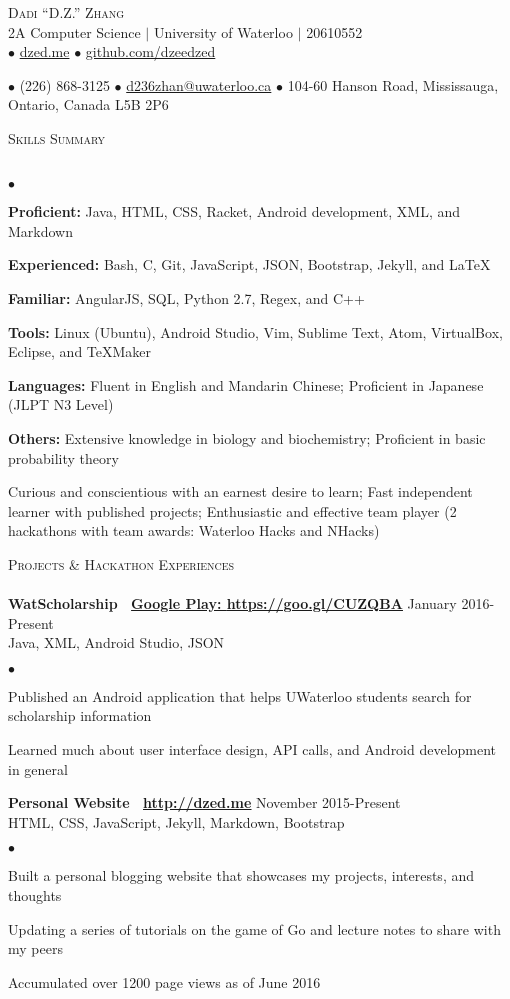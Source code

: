 \documentclass{article}
\newcommand{\lineunder}{\vspace*{-8pt} \\ \hspace*{-18pt} \hrulefill \\}
\newcommand{\header}[1]{{\hspace*{-15pt}\vspace*{6pt} \textsc{#1}} \vspace*{-6pt} \lineunder}
\newcommand{\employer}[3]{{ \textbf{#1} \hfill #2\\ {#3}\\  }}
\newcommand{\contact}[3]{
\begin{center}
{}
\end{center}
\vspace*{-8pt}
\begin{center}
{\LARGE \scshape {#1}}\\
#2\\
#3
\end{center}
\vspace*{-8pt}
}
\newenvironment{achievements}{\begin{list}{$\bullet$}{\topsep 0pt \itemsep -2pt}}{\vspace*{4pt}\end{list}}
\begin{document}
\small
\smallskip
\vspace*{-88pt}

\contact{Dadi ``D.Z.'' Zhang}
{2A Computer Science $\vert$ University of Waterloo $\vert$ 20610552}
{$\bullet$ \href{http://dzed.me}{dzed.me}
$\bullet$ \href{http://github.com/dzeedzed}{github.com/dzeedzed}}
{$\bullet$ (226) 868-3125
$\bullet$ \href{mailto:d236zhan@uwaterloo.ca}{d236zhan@uwaterloo.ca}
$\bullet$ 104-60 Hanson Road, Mississauga, Ontario, Canada L5B 2P6}

\hfill \break
\header{Skills Summary}
\begin{achievements}
\item \textbf{Proficient:} Java, HTML, CSS, Racket, Android development, XML, and Markdown
\item \textbf{Experienced:} Bash, C, Git, JavaScript, JSON, Bootstrap, Jekyll, and  \LaTeX\
\item \textbf{Familiar:} AngularJS, SQL, Python 2.7, Regex, and C++
\item \textbf{Tools:} Linux (Ubuntu), Android Studio, Vim, Sublime Text, Atom, VirtualBox, Eclipse, and TeXMaker
\item \textbf{Languages:} Fluent in English and Mandarin Chinese; Proficient in Japanese (JLPT N3 Level)
\item \textbf{Others:} Extensive knowledge in biology and biochemistry; Proficient in basic probability theory
\item Curious and conscientious with an earnest desire to learn; Fast independent learner with published projects; Enthusiastic and effective team player (2 hackathons with team awards: Waterloo Hacks and NHacks)
\end{achievements}

\header{Projects \& Hackathon Experiences}

\employer{WatScholarship \hspace{5pt} \Mundus~\href{https://goo.gl/CUZQBA}{Google Play: \underline{https://goo.gl/CUZQBA}}}{January 2016-Present}{Java, XML, Android Studio, JSON}
	\begin{achievements}
	\item Published an Android application that helps UWaterloo students search for scholarship information
	\item Learned much about user interface design, API calls, and Android development in general
	\end{achievements}
	
\employer{Personal Website \hspace{5pt} \Mundus~\href{http://dzed.me}{\underline{http://dzed.me}}}{November 2015-Present}{HTML, CSS, JavaScript, Jekyll, Markdown, Bootstrap}
	\begin{achievements}
	\item Built a personal blogging website that showcases my projects, interests, and thoughts
	\item Updating a series of tutorials on the game of Go and lecture notes to share with my peers
	\item Accumulated over 1200 page views as of June 2016
	\end{achievements}
	
\end{document}
